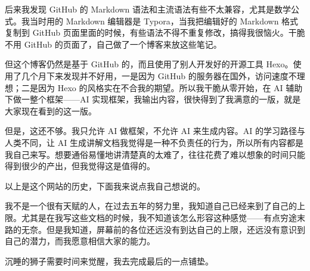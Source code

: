后来我发现 GitHub 的 Markdown 语法和主流语法有些不太兼容，尤其是数学公式。我当时用的 Markdown 编辑器是 Typora，当我把编辑好的 Markdown 格式复制到 GitHub 页面里面的时候，有些语法不得不重复修改，搞得我很恼火。干脆不用 GitHub 的页面了，自己做了一个博客来放这些笔记。

但这个博客仍然是基于 GitHub 的，而且使用了别人开发好的开源工具 Hexo。使用了几个月下来发现并不好用，一是因为 GitHub 的服务器在国外，访问速度不理想；二是因为 Hexo 的风格实在不合我的期望。所以我干脆从零开始，在 AI 辅助下做一整个框架——AI 实现框架，我输出内容，很快得到了我满意的一版，就是大家现在看到的这一版。

但是，这还不够。我只允许 AI 做框架，不允许 AI 来生成内容。AI 的学习路径与人类不同，让 AI 生成讲解文档我觉得是一种不负责任的行为，所以所有内容都是我自己来写。想要通俗易懂地讲清楚真的太难了，往往花费了难以想象的时间只能得到很少的产出，但我觉得这是值得的。

以上是这个网站的历史，下面我来说点我自己想说的。

我不是一个很有天赋的人，在过去五年的努力里，我知道自己已经来到了自己的上限。尤其是在我写这些文档的时候，我不知道该怎么形容这种感觉——有点穷途末路的无奈。但是我知道，屏幕前的各位还远没有到达自己的上限，还远没有意识到自己的潜力，而我愿意相信大家的能力。

沉睡的狮子需要时间来觉醒，我去完成最后的一点铺垫。